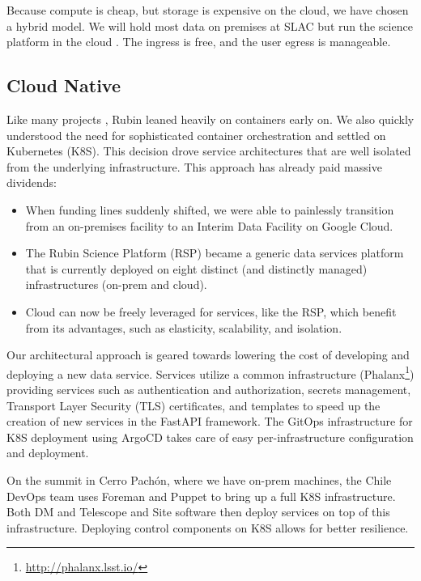 \documentclass[11pt,twoside]{article}
\begin{document}

Because compute is cheap, but storage is expensive on the cloud, we have chosen a hybrid model.
We will hold most data on premises at SLAC but run the science platform in the cloud \citep{2021arXiv211115030O}.
The ingress is free, and the user egress is manageable.

\subsection{Cloud Native}
\label{sec:cloudnative}
Like many projects \citep{2017ASPC..512...33O}, Rubin leaned heavily on containers early on.
We also quickly understood the need for sophisticated container orchestration and settled on Kubernetes (K8S).
This decision drove service architectures that are well isolated from the underlying infrastructure.
This approach has already paid massive dividends:

\begin{itemize}
\item When funding lines suddenly shifted, we were able to painlessly transition from an on-premises facility to an Interim Data Facility on Google Cloud.
\item The Rubin Science Platform (RSP) became a generic data services platform that is currently deployed on eight distinct (and distinctly managed) infrastructures (on-prem and cloud).
\item Cloud can now be freely leveraged for services, like the RSP, which benefit from its advantages, such as elasticity, scalability, and isolation.
\end{itemize}

Our architectural approach is geared towards lowering the cost of developing and deploying a new data service.
Services utilize a common infrastructure (Phalanx\footnote{\url{http://phalanx.lsst.io/}}) providing services such as authentication and authorization, secrets management, Transport Layer Security (TLS) certificates, and templates to speed up the creation of new services in the FastAPI framework.
The GitOps infrastructure for K8S deployment using ArgoCD takes care of easy per-infrastructure configuration and deployment.

On the summit in Cerro Pach\'{o}n, where we have on-prem machines, the Chile DevOps team uses Foreman and Puppet to bring up a full K8S infrastructure.
Both DM and Telescope and Site software then deploy services on top of this infrastructure.
Deploying control components on K8S allows for better resilience.
\end{document}
